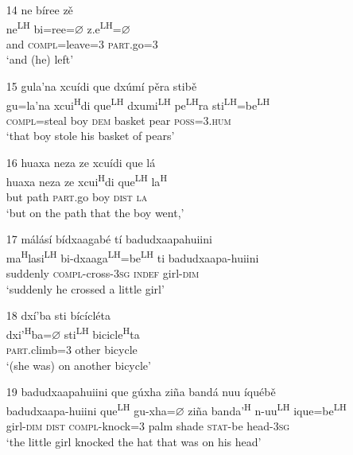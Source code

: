 \begin{itemize}
 
 \item[14]
\glll ne b\'{i}ree z\v{e}\\
ne\textsuperscript{LH} bi=ree={$\varnothing$} z.e\textsuperscript{LH}={$\varnothing$}\\
and \textsc{compl}=leave=\textsc{3} \textsc{part}.go=\textsc{3}\\
\glt `and (he) left'


\item[15]
\glll gula'na xcu\'{i}di que dx\'{u}m\'{i} p\v{e}ra stib\v{e}\\
gu=la'na xcui\textsuperscript{H}di que\textsuperscript{LH} dxumi\textsuperscript{LH} pe\textsuperscript{LH}ra sti\textsuperscript{LH}=be\textsuperscript{LH}\\
\textsc{compl}=steal boy \textsc{dem} basket pear \textsc{poss}=\textsc{3.hum}\\
\glt `that boy stole his basket of pears'


\item[16]
\glll huaxa neza ze xcu\'{i}di que l\'{a}\\
huaxa neza ze xcui\textsuperscript{H}di que\textsuperscript{LH} la\textsuperscript{H}\\
but path \textsc{part}.go boy \textsc{dist} \textsc{la}\\
\glt `but on the path that the boy went,'
\glend


\item[17]
\glll m\'{a}l\'{a}s\'{i} b\'{i}dxaagab\'{e} t\'{i} badudxaapahuiini\\
ma\textsuperscript{H}lasi\textsuperscript{LH} bi-dxaaga\textsuperscript{LH}=be\textsuperscript{LH} ti badudxaapa-huiini\\
suddenly \textsc{compl}-cross-3\textsc{sg} \textsc{indef} girl-\textsc{dim}\\
\glt `suddenly he crossed a little girl'
\glend


\item[18]
\glll dx\'{i}'ba sti b\'{i}c\'{i}cl\'{e}ta\\
dxi'\textsuperscript{H}ba=$\varnothing$ sti\textsuperscript{LH} bicicle\textsuperscript{H}ta\\
\textsc{part}.climb=\textsc{3} other bicycle\\
\glt `(she was) on another bicycle'


\item[19]
\glll badudxaapahuiini que g\'{u}xha zi\~{n}a band\'{a} nuu \'{i}qu\'{e}b\v{e}\\
badudxaapa-huiini que\textsuperscript{LH} gu-xha=$\varnothing$ zi\~{n}a banda'\textsuperscript{H} n-uu\textsuperscript{LH} ique=be\textsuperscript{LH}\\
girl-\textsc{dim} \textsc{dist} \textsc{compl}-knock=\textsc{3} palm shade \textsc{stat}-be head-3\textsc{sg}\\
\glt `the little girl knocked the hat that was on his head' 



\end{itemize}

